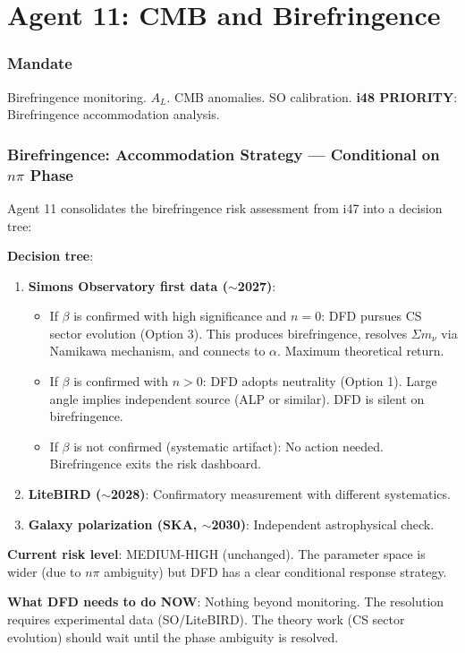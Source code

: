 \documentclass[11pt,a4paper]{article}
\begin{document}
\part{Agent 11: CMB and Birefringence}
\label{part:agent11}

\section{Mandate}

Birefringence monitoring. $A_L$. CMB anomalies. SO calibration. \textbf{i48 PRIORITY}: Birefringence accommodation analysis.

\section{Birefringence: Accommodation Strategy --- Conditional on $n\pi$ Phase}

\begin{tcolorbox}[colback=yellow!5!white, colframe=yellow!60!black,
  title={i48 Birefringence Strategy: DFD Response Depends on Phase Ambiguity Resolution}]

Agent 11 consolidates the birefringence risk assessment from i47 into a decision tree:

\textbf{Decision tree}:
\begin{enumerate}
\item \textbf{Simons Observatory first data ($\sim$2027)}:
  \begin{itemize}
  \item If $\beta$ is confirmed with high significance and $n = 0$: DFD pursues CS sector evolution (Option 3). This produces birefringence, resolves $\Sigma m_\nu$ via Namikawa mechanism, and connects to $\alpha$. Maximum theoretical return.
  \item If $\beta$ is confirmed with $n > 0$: DFD adopts neutrality (Option 1). Large angle implies independent source (ALP or similar). DFD is silent on birefringence.
  \item If $\beta$ is not confirmed (systematic artifact): No action needed. Birefringence exits the risk dashboard.
  \end{itemize}
\item \textbf{LiteBIRD ($\sim$2028)}: Confirmatory measurement with different systematics.
\item \textbf{Galaxy polarization (SKA, $\sim$2030)}: Independent astrophysical check.
\end{enumerate}

\textbf{Current risk level}: MEDIUM-HIGH (unchanged). The parameter space is wider (due to $n\pi$ ambiguity) but DFD has a clear conditional response strategy.

\textbf{What DFD needs to do NOW}: Nothing beyond monitoring. The resolution requires experimental data (SO/LiteBIRD). The theory work (CS sector evolution) should wait until the phase ambiguity is resolved.
\end{tcolorbox}
\end{document}
